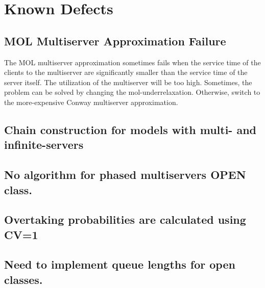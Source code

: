 
\chapter{Known Defects}
\label{sec:defects}

\section{MOL Multiserver Approximation Failure}
\label{sec:MOLMultiserver}

The MOL multiserver approximation sometimes fails when the service
time of the clients to the multiserver are significantly smaller than
the service time of the server itself.  The utilization of the
multiserver will be too high.  Sometimes, the problem can be solved by
changing the mol-underrelaxation.  Otherwise, switch to the
more-expensive Conway multiserver approximation.

\section{Chain construction for models with multi- and infinite-servers}
\label{sec:ChainConstruction}

\section{No algorithm for phased multiservers OPEN class.}
\label{sec:PhaseMultiOpen}

\section{Overtaking probabilities are calculated using CV=1}
\label{sec:Overtaking}

\section{Need to implement queue lengths for open classes.}
\label{sec:QueueLengths}



